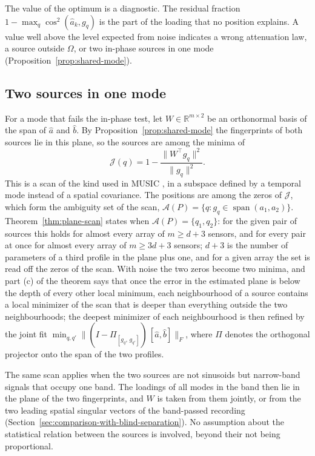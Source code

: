 \documentclass{article}
\begin{document}
The value of the optimum is a diagnostic. The residual fraction $1 - \max_q \cos^2(\widehat{a}_k, g_q)$ is the part of the loading that no position explains. A value well above the level expected from noise indicates a wrong attenuation law, a source outside $\Omega$, or two in-phase sources in one mode (Proposition~\ref{prop:shared-mode}).

\subsection{Two sources in one mode}\label{sec:two-sources-in-one}

For a mode that fails the in-phase test, let $W \in \mathbb{R}^{m \times 2}$ be an orthonormal basis of the span of $\widehat{a}$ and $\widehat{b}$. By Proposition~\ref{prop:shared-mode} the fingerprints of both sources lie in this plane, so the sources are among the minima of \[
\mathcal{J}(q) = 1 - \frac{\lVert W^{\top} g_q \rVert^{2}}{\lVert g_q \rVert^{2}} .
\] This is a scan of the kind used in MUSIC \cite{ref-Schmidt}, in a subspace defined by a temporal mode instead of a spatial covariance. The positions are among the zeros of $\mathcal{J}$, which form the ambiguity set of the scan, $\mathcal{A}(P) = \{q : g_q \in \operatorname{span}(a_1, a_2)\}$. Theorem~\ref{thm:plane-scan} states when $\mathcal{A}(P) = \{q_1, q_2\}$: for the given pair of sources this holds for almost every array of $m \ge d + 3$ sensors, and for every pair at once for almost every array of $m \ge 3d + 3$ sensors; $d + 3$ is the number of parameters of a third profile in the plane plus one, and for a given array the set is read off the zeros of the scan. With noise the two zeros become two minima, and part (c) of the theorem says that once the error in the estimated plane is below the depth of every other local minimum, each neighbourhood of a source contains a local minimizer of the scan that is deeper than everything outside the two neighbourhoods; the deepest minimizer of each neighbourhood is then refined by the joint fit $\min_{q, q'} \lVert (I - \Pi_{[g_q,\, g_{q'}]})\, [\widehat{a}, \widehat{b}] \rVert_F$, where $\Pi$ denotes the orthogonal projector onto the span of the two profiles.

The same scan applies when the two sources are not sinusoids but narrow-band signals that occupy one band. The loadings of all modes in the band then lie in the plane of the two fingerprints, and $W$ is taken from them jointly, or from the two leading spatial singular vectors of the band-passed recording (Section~\ref{sec:comparison-with-blind-separation}). No assumption about the statistical relation between the sources is involved, beyond their not being proportional.
\end{document}
